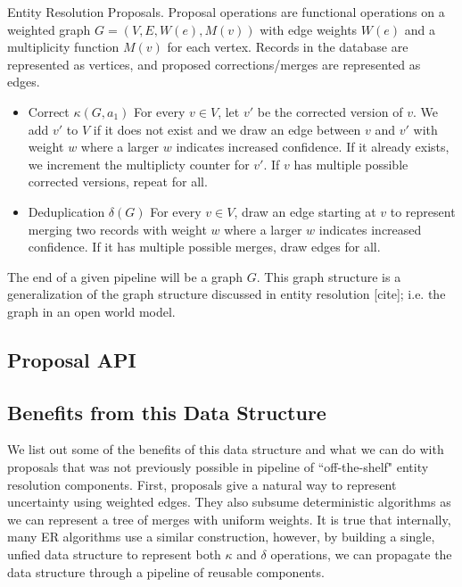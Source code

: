 \begin{definition} Entity Resolution Proposals. 
Proposal operations are functional operations on a weighted graph $G=(V,E,W(e),M(v))$ with edge weights $W(e)$ and a multiplicity function $M(v)$ for each vertex. 
Records in the database are represented as vertices, and proposed corrections/merges are represented as edges.
\begin{itemize}
\item Correct $\kappa(G,a_{1})$ For every $v \in V$, let $v'$ be the corrected version of $v$. We add $v'$ to $V$ if it does not exist and we draw an edge between $v$ and $v'$ with weight $w$ where a larger $w$ indicates increased confidence. If it already exists, we increment the multiplicty counter for $v'$. If $v$ has multiple possible corrected versions, repeat for all.
\item Deduplication $\delta(G)$ For every $v \in V$, draw an edge starting at $v$ to represent merging two records with weight $w$ where a larger $w$ indicates increased confidence. If it has multiple possible merges, draw edges for all.
\end{itemize}
\end{definition}

The end of a given pipeline will be a graph $G$. 
This graph structure is a generalization of the graph structure discussed in entity resolution [cite]; i.e. the graph in an open world model.

\subsection{Proposal API}

\subsection{Benefits from this Data Structure}
We list out some of the benefits of this data structure and what we can do with proposals that was not previously possible in pipeline of ``off-the-shelf" entity resolution components. First, proposals give a natural way to represent uncertainty using weighted edges. They also subsume deterministic algorithms as we can represent a tree of merges with uniform weights. It is true that internally, many ER algorithms use a similar construction, however, by building a single, unfied data structure to represent both $\kappa$ and $\delta$ operations, we can propagate the data structure through a pipeline of reusable components. 


